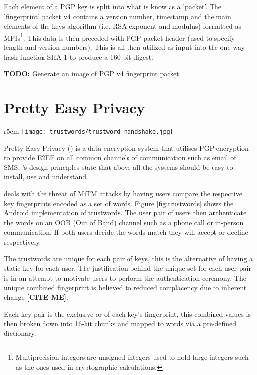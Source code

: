 Each element of a PGP key is split into what is know as a 'packet'. The 'fingerprint' packet v4 contains a version number, timestamp and the main elements of the keys algorithm (i.e. RSA exponent and modulus) formatted as MPIs\footnote{Multiprecision integers are unsigned integers used to hold large integers such as the ones used in cryptographic calculations.}. This data is then preceded with PGP packet header (used to specify length and version numbers). This is all then utilized as input into the one-way hash function SHA-1 to produce a 160-bit digest.

\textbf{TODO: } Generate an image of PGP v4 fingerprint packet

\newpage

\section{Pretty Easy Privacy}
\begin{wrapfigure}{r}{5cm}
    \centering
    \texttt{[image: trustwords/trustword\_handshake.jpg]}
    \caption{Trustword fingerprint verification}
    \label{fig:trustwords}
\end{wrapfigure}

Pretty Easy Privacy (\pep) is a data encryption system that utilises PGP encryption to provide E2EE on all common channels of communication such as email of SMS. \pep's design principles state that above all the systems should be easy to install, use and understand.

\pep deals with the threat of MiTM attacks by having users compare the respective key fingerprints encoded as a set of words. Figure \ref{fig:trustwords} shows the \pep Android implementation of trustwords. The user pair of users then authenticate the words on an OOB (Out of Band) channel such as a phone call or in-person communication. If both users decide the words match they will accept or decline respectively.

The trustwords are unique for each pair of keys, this is the alternative of having a static key for each user. The justification behind the unique set for each user pair is in an attempt to motivate users to perform the authentication ceremony. The unique combined fingerprint is believed to reduced complacency due to inherent change \textbf{[CITE ME]}. 

Each key pair is the exclusive-or of each key's fingerprint, this combined values is then broken down into 16-bit chunks and mapped to words via a pre-defined dictionary.

